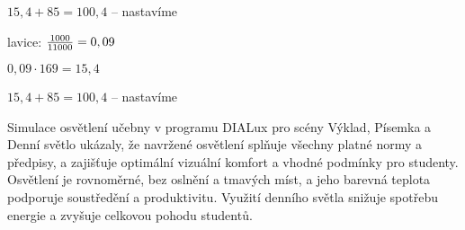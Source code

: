         $15,4 + 85 = 100,4$ – nastavíme

lavice: ${1000 \over 11000} = 0,09$

        ${0,09 \cdot 169} = 15,4$

        $15,4 + 85 = 100,4$ – nastavíme


Simulace osvětlení učebny v programu DIALux pro scény Výklad, Písemka a Denní světlo ukázaly, že navržené osvětlení
splňuje všechny platné normy a předpisy, a zajišťuje optimální vizuální komfort a vhodné podmínky pro studenty.
Osvětlení je rovnoměrné, bez oslnění a tmavých míst, a jeho barevná teplota podporuje soustředění a produktivitu.
Využití denního světla snižuje spotřebu energie a zvyšuje celkovou pohodu studentů.





